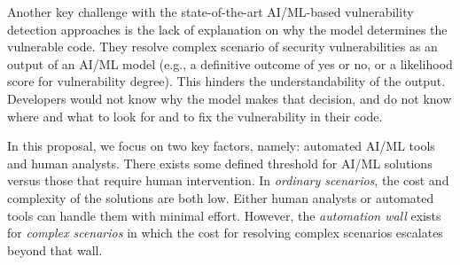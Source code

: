 
Another key challenge with the state-of-the-art AI/ML-based
vulnerability detection approaches is the lack of explanation on why
the model determines the vulnerable code. They resolve complex
scenario of security vulnerabilities as an output of an AI/ML model
(e.g., a definitive outcome of yes or no, or a likelihood score for
vulnerability degree). This hinders the understandability of the
output. Developers would not know why the model makes that decision,
and do not know where and what to look for and to fix the
vulnerability in their code.

In this proposal, we focus on two key factors, namely: automated AI/ML tools and human analysts. There exists some defined threshold for AI/ML solutions versus those that require human intervention. In \emph{ordinary scenarios}, the cost and complexity of the solutions are both low. Either human analysts or automated tools can handle them with minimal effort. However, the {\em automation wall} exists for \emph{complex scenarios} in which the cost for resolving complex scenarios escalates beyond that wall.




